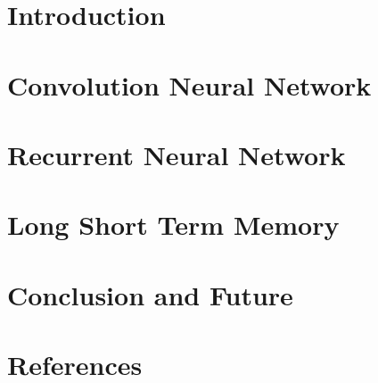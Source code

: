 \section[Intro]{Introduction}


\section[CNN]{Convolution Neural Network}



\section[RNN]{Recurrent Neural Network}


\section[LSTM]{Long Short Term Memory}


\section[End]{Conclusion and Future}


\section[Refs]{References}

